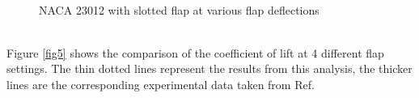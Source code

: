\documentclass[main.tex]{subfiles}
\begin{document}
\begin{figure}[h!]
    \vspace*{-1em}\centering
    \hspace*{-1.5em} \hspace*{-1.2em}
     \\\vspace*{-0.5em}
    \caption{NACA 23012 with slotted flap at various flap deflections}
    \label{fig4}
\end{figure}
\pagebreak
\\\noindent Figure \ref{fig5} shows the comparison of the coefficient of lift at 4 different flap settings. The thin dotted lines represent the results from this analysis, the thicker lines are the corresponding experimental data taken from Ref\cite{wenzinger1939wind}.
\end{document}
